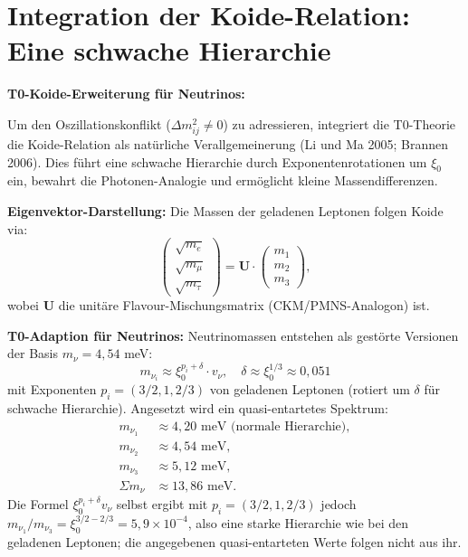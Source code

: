 	\section{Integration der Koide-Relation: Eine schwache Hierarchie}
	
	\begin{koidebox}
		\textbf{T0-Koide-Erweiterung für Neutrinos:}
		
		Um den Oszillationskonflikt ($\Delta m^2_{ij} \neq 0$) zu adressieren, integriert die T0-Theorie die Koide-Relation als natürliche Verallgemeinerung (Li und Ma 2005; Brannen 2006). Dies führt eine schwache Hierarchie durch Exponentenrotationen um $\xi_0$ ein, bewahrt die Photonen-Analogie und ermöglicht kleine Massendifferenzen.
		
		\textbf{Eigenvektor-Darstellung:}
		Die Massen der geladenen Leptonen folgen Koide via:
		\begin{equation}
			\begin{pmatrix}
				\sqrt{m_e} \\
				\sqrt{m_\mu} \\
				\sqrt{m_\tau}
			\end{pmatrix}
			= \mathbf{U} \cdot \begin{pmatrix}
				m_1 \\
				m_2 \\
				m_3
			\end{pmatrix},
		\end{equation}
		wobei $\mathbf{U}$ die unitäre Flavour-Mischungsmatrix (CKM/PMNS-Analogon) ist.
		
		\textbf{T0-Adaption für Neutrinos:}
		Neutrinomassen entstehen als gestörte Versionen der Basis $m_\nu = 4,54$ meV:
		\begin{equation}
			m_{\nu_i} \approx \xi_0^{p_i + \delta} \cdot v_\nu, \quad \delta \approx \xi_0^{1/3} \approx 0,051
		\end{equation}
		mit Exponenten $p_i = (3/2, 1, 2/3)$ von geladenen Leptonen (rotiert um $\delta$ für schwache Hierarchie). Angesetzt wird ein quasi-entartetes Spektrum:
		\begin{align}
			m_{\nu_1} &\approx 4,20 \text{ meV (normale Hierarchie)}, \\
			m_{\nu_2} &\approx 4,54 \text{ meV}, \\
			m_{\nu_3} &\approx 5,12 \text{ meV}, \\
			\Sigma m_\nu &\approx 13,86 \text{ meV}.
		\end{align}
		Die Formel $\xi_0^{p_i+\delta} v_\nu$ selbst ergibt mit $p_i = (3/2, 1, 2/3)$ jedoch $m_{\nu_1}/m_{\nu_3} = \xi_0^{3/2-2/3} = 5{,}9 \times 10^{-4}$, also eine starke Hierarchie wie bei den geladenen Leptonen; die angegebenen quasi-entarteten Werte folgen nicht aus ihr.
		

\end{koidebox}
